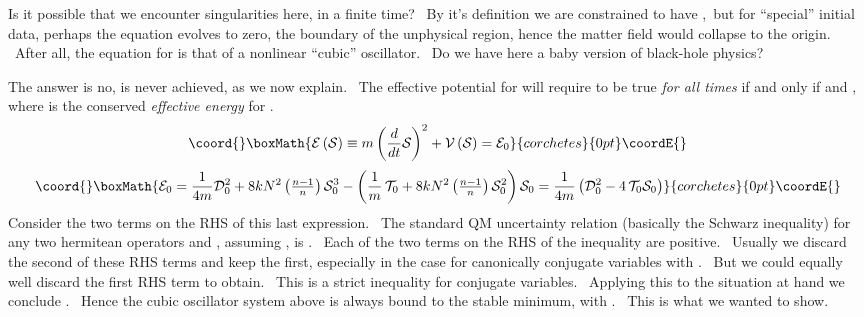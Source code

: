 \documentclass[a4paper,12pt]{article}%
\begin{document}
Is it possible that we encounter singularities here, in a finite time? \ By
it's definition we are constrained to have \coordHE{},\ but for ``special''
initial data, perhaps the equation evolves \coordHE{} to zero, the boundary of the
unphysical \coordHE{} region, hence the matter field would collapse to the origin.
\ After all, the equation for \coordHE{} is that of a nonlinear ``cubic'' oscillator.
\ Do we have here a baby version of black-hole physics?\ 

The answer is no, \coordHE{} is never achieved, as we now explain. \ The effective
potential for \coordHE{} will require \coordHE{} to be true \emph{for
all times} if and only if \coordHE{} and \coordHE{}, where \coordHE{} is the conserved \emph{effective
energy} for \coordHE{}.
\[\coord{}\boxMath{
\mathcal{E}\left(  \mathcal{S}\right)  \equiv m\left(  \frac{d}{dt}%
\mathcal{S}\right)  ^{2}+\mathcal{V}\left(  \mathcal{S}\right)  =\mathcal{E}%
_{0}%
}{corchetes}{0pt}\coordE{}\]%
\[\coord{}\boxMath{
\mathcal{E}_{0}=\frac{1}{4m}\mathcal{D}_{0}^{2}+8kN^{2}\left(  \tfrac{n-1}%
{n}\right)  \mathcal{S}_{0}^{3}-\left(  \frac{1}{m}\,\mathcal{T}_{0}%
+8kN^{2}\left(  \tfrac{n-1}{n}\right)  \mathcal{S}_{0}^{2}\right)
\mathcal{S}_{0}=\frac{1}{4m}\left(  \mathcal{D}_{0}^{2}-4\,\mathcal{T}%
_{0}\mathcal{S}_{0}\right)
}{corchetes}{0pt}\coordE{}\]
Consider the two terms on the RHS of this last expression. \ The standard QM
uncertainty relation (basically the Schwarz inequality) for any two hermitean
operators \coordHE{} and \coordHE{}, assuming \coordHE{}, is \coordHE{}. \ Each of the two terms on the RHS of the
inequality are positive. \ Usually we discard the second of these RHS terms
and keep the first, especially in the case for canonically conjugate variables
with \coordHE{}. \ But we could equally well discard the
first RHS term to obtain\coordHE{}. \ This is a strict inequality
for conjugate variables. \ Applying this to the situation at hand we conclude
\coordHE{}. \ Hence the cubic oscillator system above
is always bound to the stable minimum, with \coordHE{}. \ This is what we
wanted to show.
\end{document}
